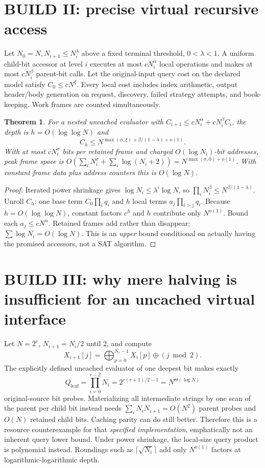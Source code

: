 \documentclass[11pt]{article}
\newtheorem{theorem}{Theorem}
\begin{document}
\section{BUILD II: precise virtual recursive access}
Let $N_0=N,N_{i+1}\le N_i^\lambda$ above a fixed terminal threshold, $0<\lambda<1$. A uniform child-bit accessor at level $i$ executes at most $cN_i^\alpha$ local operations and makes at most $cN_i^\beta$ parent-bit calls. Let the original-input query cost on the declared model satisfy $C_0\le cN^\xi$. Every local cost includes index arithmetic, output header/body generation on request, discovery, failed strategy attempts, and book-keeping. Work frames are counted simultaneously.
\begin{theorem}
For a nested uncached evaluator with $C_{i+1}\le cN_i^\alpha+cN_i^\beta C_i$, the depth is $h=O(\log\log N)$ and
\[
C_h\le N^{\max(\alpha,\xi)+\beta/(1-\lambda)+o(1)}.
\]
With at most $cN_i^\sigma$ bits per retained frame and charged $O(\log N_i)$-bit addresses, peak frame space is $O(\sum_i N_i^\sigma+\sum_i\log(N_i+2))=N^{\max(\sigma,0)+o(1)}$. With constant frame data plus address counters this is $O(\log N)$.
\end{theorem}
\begin{proof}
Iterated power shrinkage gives $\log N_i\le\lambda^i\log N$, so $\prod_iN_i^\beta\le N^{\beta/(1-\lambda)}$. Unroll $C_h$: one base term $C_0\prod_i q_i$ and $h$ local terms $a_j\prod_{i>j}q_i$. Because $h=O(\log\log N)$, constant factors $c^h$ and $h$ contribute only $N^{o(1)}$. Bound each $a_j\le cN^\alpha$. Retained frames add rather than disappear; $\sum\log N_i=O(\log N)$. This is an \emph{upper} bound conditional on actually having the promised accessors, not a SAT algorithm.
\end{proof}
\section{BUILD III: why mere halving is insufficient for an uncached virtual interface}
Let $N=2^r$, $N_{i+1}=N_i/2$ until $2$, and compute
\[
X_{i+1}[j]=\bigoplus_{p=0}^{N_i-1}X_i[p]\oplus(j\bmod2).
\]
The explicitly defined uncached evaluator of one deepest bit makes exactly
\[
Q_{\mathrm{leaf}}=\prod_{i=0}^{r-2}N_i
=2^{r(r+1)/2-1}=N^{\Theta(\log N)}
\]
original-source bit probes. Materializing all intermediate strings by one scan of the parent per child bit instead needs $\sum_iN_iN_{i+1}=O(N^2)$ parent probes and $O(N)$ retained child bits. Caching parity can do still better. Therefore this is a resource counterexample for that \emph{specified implementation}, emphatically not an inherent query lower bound. Under power shrinkage, the local-size query product is polynomial instead. Roundings such as $\lceil\sqrt{N_i}\rceil$ add only $N^{o(1)}$ factors at logarithmic-logarithmic depth.
\end{document}
